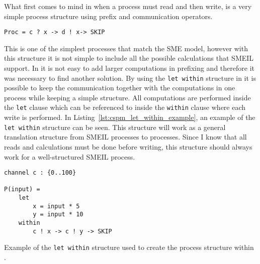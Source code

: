 What first comes to mind in \cspm{} when a process must read and then write, is a very simple process structure using prefix and communication operators.
\begin{verbatim}
Proc = c ? x -> d ! x-> SKIP
\end{verbatim}
This is one of the simplest \cspm{} processes that match the SME model, however with this structure it is not simple to include all the possible calculations that SMEIL support. In \cspm{} it is not easy to add larger computations in prefixing and therefore it was necessary to find another solution. By using the \texttt{let within} structure in \cspm{} it is possible to keep the communication together with the computations in one \cspm{} process while keeping a simple structure. All computations are performed inside the \texttt{let} clause which can be referenced to inside the \texttt{within} clause where each write is performed.
In Listing~\ref{lst:cspm_let_within_example}, an example of the \texttt{let within} structure can be seen. This structure will work as a general translation structure from SMEIL processes to \cspm{} processes. Since I know that all reads and calculations must be done before writing, this structure should always work for a well-structured SMEIL process.
\begin{listing}
\begin{verbatim}
channel c : {0..100}

P(input) =
    let
        x = input * 5
        y = input * 10
    within
        c ! x -> c ! y -> SKIP
\end{verbatim}
\caption{Example of the \texttt{let within} structure used to create the process structure within \cspm{}.}
\label{lst:cspm_let_within_example}
\end{listing}
